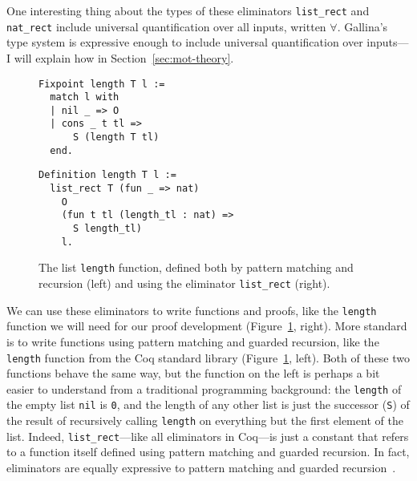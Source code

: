 One interesting thing about the types of these eliminators \lstinline{list_rect} and \lstinline{nat_rect}
include universal quantification over all inputs, written $\forall$.
Gallina's type system is expressive enough to include universal quantification over inputs---I will explain how
in Section~\ref{sec:mot-theory}.

\begin{figure}
\begin{minipage}{0.42\textwidth}
\begin{lstlisting}
Fixpoint length T l :=
  match l with
  | nil _ => O
  | cons _ t tl =>
      S (length T tl)
  end.
\end{lstlisting}
\end{minipage}
\hfill
\begin{minipage}{0.54\textwidth}
\begin{lstlisting}
Definition length T l :=
  list_rect T (fun _ => nat)
    O
    (fun t tl (length_tl : nat) =>
      S length_tl)
    l.
\end{lstlisting}
\end{minipage}
\caption{The list \lstinline{length} function, defined both by pattern matching and recursion (left) and using the eliminator \lstinline{list_rect} (right).}
\label{fig:length}
\end{figure}

We can use these eliminators to write functions and proofs, like the \lstinline{length} function we will need for our proof development (Figure~\ref{fig:length}, right).
More standard is to write functions using pattern matching and guarded recursion, like the \lstinline{length} function from the Coq standard library (Figure~\ref{fig:length}, left).
Both of these two functions behave the same way, but the function on the left is perhaps a bit easier to understand from a traditional programming background:
the \lstinline{length} of the empty list \lstinline{nil} is \lstinline{0}, and the length of any other list
is just the successor (\lstinline{S}) of the result of recursively calling \lstinline{length} on everything but the first element of the list.
Indeed, \lstinline{list_rect}---like all eliminators in Coq---is just a constant that refers to a function itself defined using pattern matching and guarded recursion.
In fact, eliminators are equally expressive to pattern matching and guarded recursion~\cite{TODO}. %

